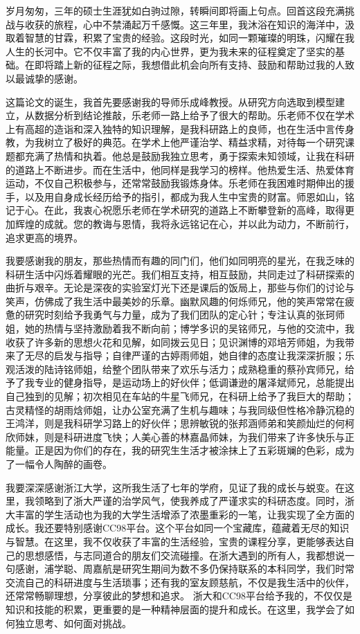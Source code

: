 \cleardoublepage

岁月匆匆，三年的硕士生涯犹如白驹过隙，转瞬间即将画上句点。回首这段充满挑战与收获的旅程，心中不禁涌起万千感慨。这三年里，我沐浴在知识的海洋中，汲取着智慧的甘霖，积累了宝贵的经验。这段时光，如同一颗璀璨的明珠，闪耀在我人生的长河中。它不仅丰富了我的内心世界，更为我未来的征程奠定了坚实的基础。在即将踏上新的征程之际，我想借此机会向所有支持、鼓励和帮助过我的人致以最诚挚的感谢。

这篇论文的诞生，我首先要感谢我的导师乐成峰教授。从研究方向选取到模型建立，从数据分析到结论推敲，乐老师一路上给予了很大的帮助。乐老师不仅在学术上有高超的造诣和深入独特的知识理解，是我科研路上的良师，也在生活中言传身教，为我树立了极好的典范。在学术上他严谨治学、精益求精，对待每一个研究课题都充满了热情和执着。他总是鼓励我独立思考，勇于探索未知领域，让我在科研的道路上不断进步。而在生活中，他同样是我学习的榜样。他热爱生活、热爱体育运动，不仅自己积极参与，还常常鼓励我锻炼身体。乐老师在我困难时期伸出的援手，以及用自身成长经历给予的指引，都成为我人生中宝贵的财富。师恩如山，铭记于心。在此，我衷心祝愿乐老师在学术研究的道路上不断攀登新的高峰，取得更加辉煌的成就。您的教诲与恩情，我将永远铭记在心，并以此为动力，不断前行，追求更高的境界。

我要感谢我的朋友，那些热情而有趣的同门们，他们如同明亮的星光，在我乏味的科研生活中闪烁着耀眼的光芒。我们相互支持，相互鼓励，共同走过了科研探索的曲折与艰辛。无论是深夜的实验室灯光下还是课后的饭局上，那些与你们的讨论与笑声，仿佛成了我生活中最美妙的乐章。幽默风趣的何烁师兄，他的笑声常常在疲惫的研究时刻给予我勇气与力量，成为了我们团队的定心针；专注认真的张珂师姐，她的热情与坚持激励着我不断向前；博学多识的吴铭师兄，与他的交流中，我收获了许多新的思想火花和见解，如同拨云见日；见识渊博的邓培芳师姐，为我带来了无尽的启发与指导；自律严谨的古婷雨师姐，她自律的态度让我深深折服；乐观活泼的陆诗铭师姐，给整个团队带来了欢乐与活力；成熟稳重的蔡孙宾师兄，给予了我专业的健身指导，是运动场上的好伙伴；低调谦逊的屠泽斌师兄，总能提出自己独到的见解；初次相见在车站的牛星飞师兄，在科研上给予了我巨大的帮助；古灵精怪的胡雨焓师姐，让办公室充满了生机与趣味；与我同级但性格冷静沉稳的王鸿洋，则是我科研学习路上的好伙伴；思辨敏锐的张邦涵师弟和笑颜灿烂的何柯欣师妹，则是科研进度飞快；人美心善的林嘉晶师妹，为我们带来了许多快乐与正能量。正是因为你们的存在，我的研究生生活才被涂抹上了五彩斑斓的色彩，成为了一幅令人陶醉的画卷。

我要深深感谢浙江大学，这所我生活了七年的学府，见证了我的成长与蜕变。在这里，我领略到了浙大严谨的治学风气，使我养成了严谨求实的科研态度。同时，浙大丰富的学生活动也为我的大学生活增添了浓墨重彩的一笔，让我实现了全方面的成长。我还要特别感谢CC98平台。这个平台如同一个宝藏库，蕴藏着无尽的知识与智慧。在这里，我不仅收获了丰富的生活经验，宝贵的课程分享，更能够表达自己的思想感悟，与志同道合的朋友们交流碰撞。在浙大遇到的所有人，我都想说一句感谢，浦学聪、周嘉航是研究生期间为数不多仍保持联系的本科同学，我们时常交流自己的科研进度与生活琐事；还有我的室友顾慈航，不仅是我生活中的伙伴，还常常畅聊理想，分享彼此的梦想和追求。
浙大和CC98平台给予我的，不仅仅是知识和技能的积累，更重要的是一种精神层面的提升和成长。在这里，我学会了如何独立思考、如何面对挑战。

